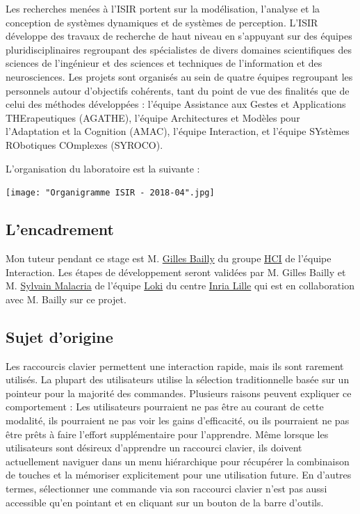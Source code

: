 \documentclass[12pt,a4paper]{article}
\begin{document}
Les recherches menées à l'ISIR portent sur la modélisation, l'analyse et la conception de systèmes dynamiques et de systèmes de perception. L'ISIR développe des travaux de recherche de haut niveau en s'appuyant sur des équipes pluridisciplinaires regroupant des spécialistes de divers domaines scientifiques des sciences de l'ingénieur et des sciences et techniques de l'information et des neurosciences. Les projets sont organisés au sein de quatre équipes regroupant les personnels autour d'objectifs cohérents, tant du point de vue des finalités que de celui des méthodes développées :  l'équipe Assistance aux Gestes et Applications THErapeutiques (AGATHE), l'équipe Architectures et Modèles pour l'Adaptation et la Cognition (AMAC), l'équipe Interaction, et l'équipe SYstèmes RObotiques COmplexes (SYROCO).

L'organisation du laboratoire est la suivante :\\
\begin{center}
	\texttt{[image: "Organigramme ISIR - 2018-04".jpg]}
\end{center}
\subsection{L'encadrement}
Mon tuteur pendant ce stage est M. \href{https://www.gillesbailly.fr/}{Gilles Bailly} du groupe \href{https://hci.isir.upmc.fr/}{HCI} de l'équipe Interaction. Les étapes de développement seront validées par M. Gilles Bailly et M. \href{http://www.malacria.com/}{Sylvain Malacria} de l'équipe \href{http://loki.lille.inria.fr/}{Loki} du centre \href{https://www.inria.fr/centre/lille/}{Inria Lille} qui est en collaboration avec M. Bailly sur ce projet.
\subsection{Sujet d'origine}
Les raccourcis clavier permettent une interaction rapide, mais ils sont rarement utilisés. La plupart des utilisateurs utilise la sélection traditionnelle basée sur un pointeur pour la majorité des commandes. Plusieurs raisons peuvent expliquer ce comportement \cite{1}: Les utilisateurs pourraient ne pas être au courant de cette modalité, ils pourraient ne pas voir les gains d'efficacité, ou ils pourraient ne pas
être prêts à faire l'effort supplémentaire pour l'apprendre. Même lorsque les utilisateurs sont désireux d’apprendre un raccourci clavier, ils doivent actuellement naviguer dans un menu hiérarchique pour récupérer la combinaison de touches et la mémoriser explicitement pour une utilisation future. En d'autres termes, sélectionner une commande via son raccourci clavier n'est pas aussi accessible qu'en pointant et en cliquant sur un bouton de la barre d’outils.
\end{document}

